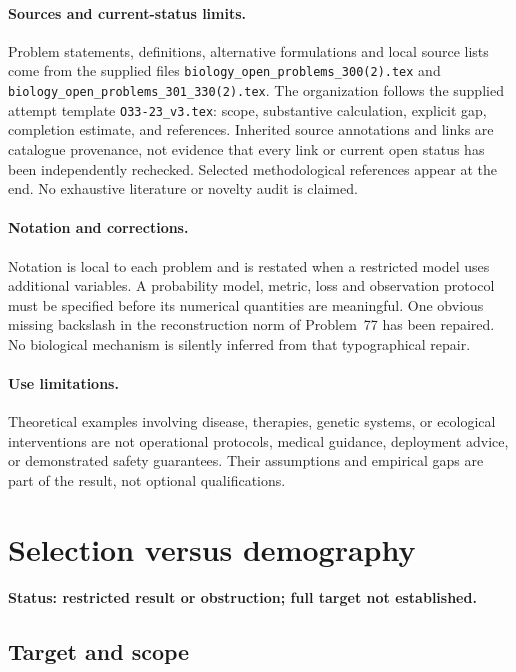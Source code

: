 \documentclass[11pt]{article}
\begin{document}
\paragraph{Sources and current-status limits.}
Problem statements, definitions, alternative formulations and local source lists
come from the supplied files
\texttt{biology\_open\_problems\_300(2).tex} and
\texttt{biology\_open\_problems\_301\_330(2).tex}.
The organization follows the supplied attempt template
\texttt{O33-23\_v3.tex}: scope, substantive calculation, explicit gap,
completion estimate, and references. Inherited source annotations and links are
catalogue provenance, not evidence that every link or current open status has
been independently rechecked. Selected methodological references appear at the
end. No exhaustive literature or novelty audit is claimed.

\paragraph{Notation and corrections.}
Notation is local to each problem and is restated when a restricted model uses
additional variables. A probability model, metric, loss and observation protocol
must be specified before its numerical quantities are meaningful. One obvious
missing backslash in the reconstruction norm of Problem~77 has been repaired.
No biological mechanism is silently inferred from that typographical repair.

\paragraph{Use limitations.}
Theoretical examples involving disease, therapies, genetic systems, or ecological
interventions are not operational protocols, medical guidance, deployment advice,
or demonstrated safety guarantees. Their assumptions and empirical gaps are part
of the result, not optional qualifications.


\section*{Selection versus demography}
\label{prob:163}
\noindent\textbf{Status: restricted result or obstruction; full target not established.}
\subsection{Target and scope}
\end{document}
